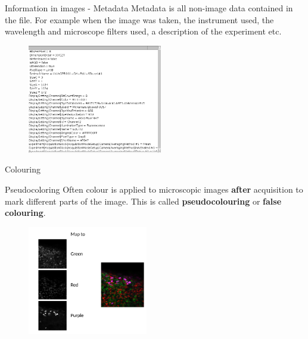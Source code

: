 \documentclass[9pt, aspectratio=169]{beamer}
\begin{document}
\begin{frame}
	{Information in images - Metadata}
	Metadata is all non-image data contained in the file. For example when the image was taken, the instrument used, the wavelength and microscope filters used, a description of the experiment etc.

	\begin{figure}
		\centering
		\includegraphics[height=180px]{metadata.png}
	\end{figure}
\end{frame}

\begin{frame}
	\Huge
	\centering
	Colouring
\end{frame}

\begin{frame}
	{Pseudocoloring}
	Often colour is applied to microscopic images \textbf{after} acquisition to mark different parts of the image. This is called \textbf{pseudocolouring} or \textbf{false colouring}.
	\begin{figure}
		\centering
		\includegraphics[height=180px]{pseudocolor.png}
	\end{figure}
\end{frame}

\end{document}
